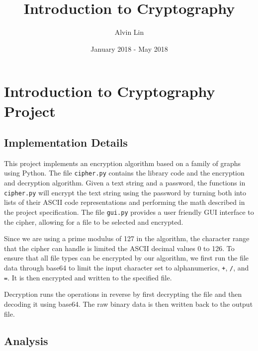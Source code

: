 \documentclass{math}
\title{Introduction to Cryptography}
\author{Alvin Lin}
\date{January 2018 - May 2018}
\begin{document}
\maketitle

\section*{Introduction to Cryptography Project}

\subsection*{Implementation Details}
This project implements an encryption algorithm based on a family of graphs
using Python. The file \texttt{cipher.py} contains the library code and the
encryption and decryption algorithm. Given a text string and a password, the
functions in \texttt{cipher.py} will encrypt the text string using the password
by turning both into lists of their ASCII code representations and performing
the math described in the project specification. The file \texttt{gui.py}
provides a user friendly GUI interface to the cipher, allowing for a file to
be selected and encrypted.
\par Since we are using a prime modulus of 127 in the algorithm, the character
range that the cipher can handle is limited the ASCII decimal values 0 to 126.
To ensure that all file types can be encrypted by our algorithm, we first run
the file data through base64 to limit the input character set to alphanumerics,
\texttt{+}, \texttt{/}, and \texttt{=}. It is then encrypted and written to the
specified file.
\par Decryption runs the operations in reverse by first decrypting the file
and then decoding it using base64. The raw binary data is then written back to
the output file.

\subsection*{Analysis}
\end{document}
